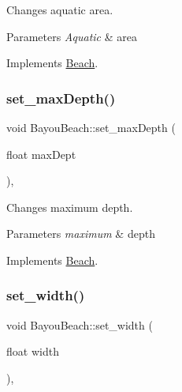 Changes aquatic area. 


\begin{DoxyParams}{Parameters}
{\em Aquatic} & area \\
\hline
\end{DoxyParams}


Implements \hyperlink{class_beach_a37e71c3348356d49f3b1080973708376}{Beach}.

\mbox{\label{class_bayou_beach_ada06dbcef6b191fc0413eca4bc5f7b65}} 
\subsubsection{\texorpdfstring{set\+\_\+max\+Depth()}{set\_maxDepth()}}
{\footnotesize\ttfamily void Bayou\+Beach\+::set\+\_\+max\+Depth (\begin{DoxyParamCaption}\item[{float}]{max\+Dept }\end{DoxyParamCaption})\hspace{0.3cm}{\ttfamily [inline]}, {\ttfamily [virtual]}}



Changes maximum depth. 


\begin{DoxyParams}{Parameters}
{\em maximum} & depth \\
\hline
\end{DoxyParams}


Implements \hyperlink{class_beach_af0226438bc6e731b2bca9f5a6078b572}{Beach}.

\mbox{\label{class_bayou_beach_a4bb316d56e931c219554b63a9ae68136}} 
\subsubsection{\texorpdfstring{set\+\_\+width()}{set\_width()}}
{\footnotesize\ttfamily void Bayou\+Beach\+::set\+\_\+width (\begin{DoxyParamCaption}\item[{float}]{width }\end{DoxyParamCaption})\hspace{0.3cm}{\ttfamily [inline]}, {\ttfamily [virtual]}}



